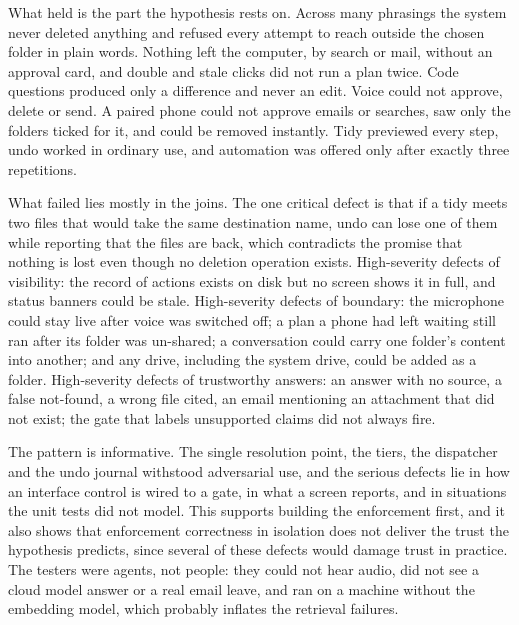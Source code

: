 What held is the part the hypothesis rests on. Across many phrasings the system never deleted anything and refused every attempt to reach outside the chosen folder in plain words. Nothing left the computer, by search or mail, without an approval card, and double and stale clicks did not run a plan twice. Code questions produced only a difference and never an edit. Voice could not approve, delete or send. A paired phone could not approve emails or searches, saw only the folders ticked for it, and could be removed instantly. Tidy previewed every step, undo worked in ordinary use, and automation was offered only after exactly three repetitions.

What failed lies mostly in the joins. The one critical defect is that if a tidy meets two files that would take the same destination name, undo can lose one of them while reporting that the files are back, which contradicts the promise that nothing is lost even though no deletion operation exists. High-severity defects of visibility: the record of actions exists on disk but no screen shows it in full, and status banners could be stale. High-severity defects of boundary: the microphone could stay live after voice was switched off; a plan a phone had left waiting still ran after its folder was un-shared; a conversation could carry one folder's content into another; and any drive, including the system drive, could be added as a folder. High-severity defects of trustworthy answers: an answer with no source, a false not-found, a wrong file cited, an email mentioning an attachment that did not exist; the gate that labels unsupported claims did not always fire.

The pattern is informative. The single resolution point, the tiers, the dispatcher and the undo journal withstood adversarial use, and the serious defects lie in how an interface control is wired to a gate, in what a screen reports, and in situations the unit tests did not model. This supports building the enforcement first, and it also shows that enforcement correctness in isolation does not deliver the trust the hypothesis predicts, since several of these defects would damage trust in practice. The testers were agents, not people: they could not hear audio, did not see a cloud model answer or a real email leave, and ran on a machine without the embedding model, which probably inflates the retrieval failures.

